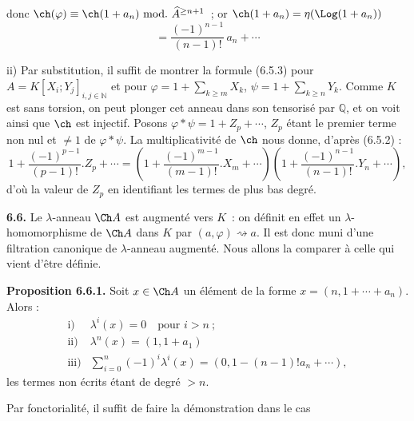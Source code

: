donc \(\ch(\varphi)\equiv\ch(1+a_n)\ \mathrm{mod.}\ \widehat A^{\ge n+1}\)~; or \(\ch(1+a_n)=\eta(\Log(1+a_n))\)
\[
  =\frac{(-1)^{n-1}}{(n-1)!}\,a_n+\cdots
\]

ii) Par substitution, il suffit de montrer la formule (6.5.3) pour \(A=K[X_i;Y_j]_{i,j\in\mathbb N}\) et pour \(\varphi=1+\sum_{k\ge m}X_k\), \(\psi=1+\sum_{k\ge n}Y_k\). Comme \(K\) est sans torsion, on peut plonger cet anneau dans son tensorisé par \(\mathbb Q\), et on voit ainsi que \(\ch\) est injectif. Posons \(\varphi*\psi=1+Z_p+\cdots\), \(Z_p\) étant le premier terme non nul et \(\neq1\) de \(\varphi*\psi\). La multiplicativité de \(\ch\) nous donne, d'après (6.5.2) :
\[
  1+\frac{(-1)^{p-1}}{(p-1)!}.Z_p+\cdots
  =
  \left(1+\frac{(-1)^{m-1}}{(m-1)!}.X_m+\cdots\right)
  \left(1+\frac{(-1)^{n-1}}{(n-1)!}.Y_n+\cdots\right),
\]
d'où la valeur de \(Z_p\) en identifiant les termes de plus bas degré.

\textbf{6.6.} Le \(\lambda\)-anneau \(\Ch A\) est augmenté vers \(K\)~: on définit en effet un \(\lambda\)-homomorphisme de \(\Ch A\) dans \(K\) par \((a,\varphi)\rightsquigarrow a\). Il est donc muni d'une filtration canonique de \(\lambda\)-anneau augmenté. Nous allons la comparer à celle qui vient d'être définie.

\textbf{Proposition 6.6.1.} Soit \(x\in\Ch A\) un élément de la forme \(x=(n,1+\cdots+a_n)\). Alors :
\[
\begin{array}{ll}
\text{i)}& \lambda^i(x)=0\quad\text{pour }i>n~;\\[0.3em]
\text{ii)}& \lambda^n(x)=(1,1+a_1)\\[0.3em]
\text{iii)}& \displaystyle\sum_{i=0}^n(-1)^i\lambda^i(x)
       =(0,1-(n-1)!a_n+\cdots),
\end{array}
\]
les termes non écrits étant de degré \(>n\).

Par fonctorialité, il suffit de faire la démonstration dans le cas 
